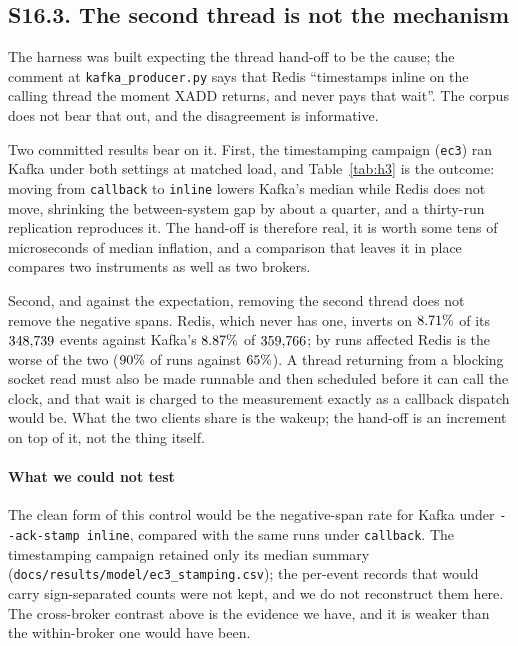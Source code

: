 \documentclass[10pt,journal,onecolumn]{IEEEtran}
\newcommand{\kafka}{Kafka}
\newcommand{\redis}{Redis}
\begin{document}
\subsection{S16.3. The second thread is not the mechanism}

The harness was built expecting the thread hand-off to be the cause; the comment at
\texttt{kafka\_producer.py} says that \redis{} ``timestamps inline on the calling thread the
moment XADD returns, and never pays that wait''. The corpus does not bear that out, and the
disagreement is informative.

Two committed results bear on it. First, the timestamping campaign (\texttt{ec3}) ran \kafka{}
under both settings at matched load, and Table~\ref{tab:h3} is the outcome: moving from
\texttt{callback} to \texttt{inline} lowers \kafka{}'s median while \redis{} does not move,
shrinking the between-system gap by about a quarter, and a thirty-run replication reproduces
it. The hand-off is therefore real, it is worth some tens of microseconds of median
inflation, and a comparison that leaves it in place compares two instruments as well as two
brokers.

Second, and against the expectation, removing the second thread does not remove the
negative spans. \redis{}, which never has one, inverts on $8.71\%$ of its
$348{,}739$ events against \kafka{}'s $8.87\%$ of $359{,}766$;
by runs affected \redis{} is the worse of the two ($90\%$ of runs
against $65\%$). A thread returning from a blocking socket read must
also be made runnable and then scheduled before it can call the clock, and that wait is
charged to the measurement exactly as a callback dispatch would be. What the two clients
share is the wakeup; the hand-off is an increment on top of it, not the thing itself.

\paragraph{What we could not test} The clean form of this control would be the negative-span rate
for \kafka{} under \texttt{-{}-ack-stamp inline}, compared with the same runs under
\texttt{callback}. The timestamping campaign retained only its median summary
(\texttt{docs/results/model/ec3\_stamping.csv}); the per-event records that would carry
sign-separated counts were not kept, and we do not reconstruct them here. The cross-broker
contrast above is the evidence we have, and it is weaker than the within-broker one would
have been.
\end{document}

